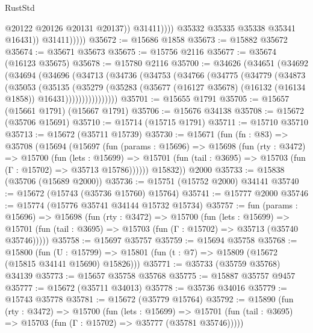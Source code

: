 \begin{lexlean}{RustStd}
\begin{coremodule}
                              @20122
                              @20126
                              @20131
                              @20137))
                          @31411))))
                  @35332
                  @35335
                  @35338
                  @35341
                  @16431))
              @31411)))))
@35672 := @15686 @1858
@35673 := @15882 @35672
@35674 := @35671 @35673
@35675 := @15756 @2116
@35677 := @35674 (@16123 @35675)
@35678 := @15780 @2116
@35700 := @34626
    (@34651
      (@34692
        (@34694
          (@34696
            (@34713
              (@34736
                (@34753
                  (@34766
                    (@34775
                      (@34779
                        (@34873
                          (@35053
                            (@35135
                              (@35279
                                (@35283
                                  (@35677
                                    (@16127 @35678)
                                    (@16132 (@16134 @1858))
                                    @16431))))))))))))))))
@35701 := @15655 @1791
@35705 := @15657 (@15661 @1791) (@15667 @1791)
@35706 := @15676 @34138
@35708 := @15672 (@35706 @15691)
@35710 := @15714 (@15715 @1791)
@35711 := @15710 @35710
@35713 := @15672 (@35711 @15739)
@35730 := @15671
    (fun (fn : @83) =>
    @35708
      (@15694
        (@15697
          (fun (params : @15696) =>
          @15698
            (fun (rty : @3472) =>
            @15700
              (fun (lets : @15699) =>
              @15701 (fun (tail : @3695) => @15703 (fun (Γ : @15702) => @35713 @15786))))))
        @15832))
    @2000
@35733 := @15838 (@35706 (@15689 @2000))
@35736 := @15751 (@15752 @2000) @34141
@35740 := @15672 (@15743 (@35736 @15760) @15764)
@35741 := @15777 @2000
@35746 := @15774 (@15776 @35741 @34144 @15732 @15734)
@35757 := fun (params : @15696) =>
  @15698
    (fun (rty : @3472) =>
    @15700
      (fun (lets : @15699) =>
      @15701 (fun (tail : @3695) => @15703 (fun (Γ : @15702) => @35713 (@35740 @35746)))))
@35758 := @15697 @35757
@35759 := @15694 @35758
@35768 := @15800
    (fun (U : @15799) => @15801 (fun (t : @7) => @15809 (@15672 (@15815 @34141 @15690) @15826)))
@35771 := @35733 (@35759 @35768) @34139
@35773 := @15657 @35758 @35768
@35775 := @15887 @35757 @9457
@35777 := @15672 (@35711 @34013)
@35778 := @35736 @34016
@35779 := @15743 @35778
@35781 := @15672 (@35779 @15764)
@35792 := @15890
    (fun (rty : @3472) =>
    @15700
      (fun (lets : @15699) =>
      @15701 (fun (tail : @3695) => @15703 (fun (Γ : @15702) => @35777 (@35781 @35746)))))

\end{coremodule}
\end{lexlean}
